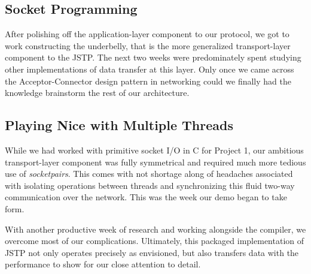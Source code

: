 \documentclass{article}
\begin{document}
\subsection{Socket Programming}
After polishing off the application-layer component to our protocol, we got to work constructing the underbelly, that is the more generalized transport-layer component to the JSTP.
The next two weeks were predominately spent studying other implementations of data transfer at this layer.
Only once we came across the Acceptor-Connector design pattern in networking could we finally had the knowledge brainstorm the rest of our architecture.

\subsection{Playing Nice with Multiple Threads}
While we had worked with primitive socket I/O in C for Project 1, our ambitious transport-layer component was fully symmetrical and required much more tedious use of \emph{socketpairs}.
This comes with not shortage along of headaches associated with isolating operations between threads and synchronizing this fluid two-way communication over the network.  This was the week our demo began to take form.

With another productive week of research and working alongside the compiler, we overcome most of our complications. Ultimately, this packaged implementation of JSTP not only operates precisely as envisioned, but also transfers data with the performance to show for our close attention to detail.
\end{document}
